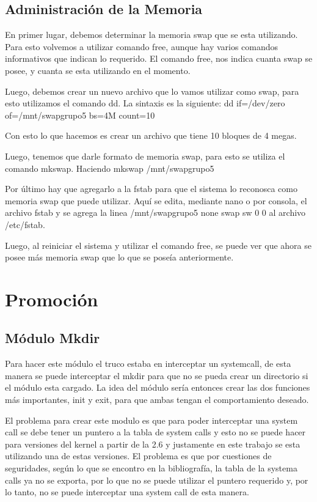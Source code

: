 \documentclass[a4paper, 12pt]{article}
\begin{document}
\subsection*{Administraci\'on de la Memoria}

En primer lugar, debemos determinar la memoria swap que se esta utilizando. Para esto volvemos a utilizar comando free, aunque hay varios comandos informativos que indican lo requerido. El comando free, nos indica cuanta swap se posee, y cuanta se esta utilizando en el momento.

Luego, debemos crear un nuevo archivo que lo vamos utilizar como swap, para esto utilizamos el comando dd. La sintaxis es la siguiente: dd if=/dev/zero of=/mnt/swapgrupo5 bs=4M count=10

Con esto lo que hacemos es crear un archivo que tiene 10 bloques de 4 megas. 

Luego, tenemos que darle formato de memoria swap, para esto se utiliza el comando mkswap. Haciendo mkswap /mnt/swapgrupo5


Por \'ultimo hay que agregarlo a la fstab para que el sistema lo reconosca como memoria swap que puede utilizar. Aqu\'i se edita, mediante nano o por consola, el archivo fstab y se agrega la linea /mnt/swapgrupo5 none swap sw 0 0 al archivo /etc/fstab.


Luego, al reiniciar el sistema y utilizar el comando free, se puede ver que ahora se posee m\'as memoria swap que lo que se pose\'ia anteriormente. 



\section*{Promoci\'on}

\subsection*{M\'odulo Mkdir}

Para hacer este m\'odulo el truco estaba en interceptar un systemcall, de esta manera se puede interceptar el mkdir para que no se pueda crear un directorio si el m\'odulo esta cargado. La idea del m\'odulo ser\'ia entonces crear las dos funciones m\'as importantes, init y exit, para que ambas tengan el comportamiento deseado.

El problema para crear este modulo es que para poder interceptar una system call se debe tener un puntero a la tabla de system calls y esto no se puede hacer para versiones del kernel a partir de la 2.6 y justamente en este trabajo se esta utilizando una de estas versiones. El problema es que por cuestiones de seguridades, seg\'un lo que se encontro en la bibliograf\'ia, la tabla de la systema calls ya no se exporta, por lo que no se puede utilizar el puntero requerido y, por lo tanto, no se puede interceptar una system call de esta manera. 
\end{document}
